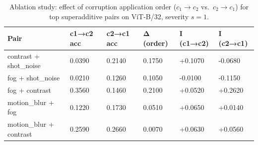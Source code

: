 \begin{table}
\caption{Ablation study: effect of corruption application order ($c_1 \to c_2$ vs.\ $c_2 \to c_1$) for top superadditive pairs on ViT-B/32, severity $s=1$.}
\label{tab:ablation}
\begin{tabular}{llllll}
\toprule
Pair & c1→c2 acc & c2→c1 acc & Δ (order) & I (c1→c2) & I (c2→c1) \\
\midrule
contrast + shot_noise & 0.0390 & 0.2140 & 0.1750 & +0.1070 & -0.0680 \\
fog + shot_noise & 0.0210 & 0.1260 & 0.1050 & -0.0100 & -0.1150 \\
fog + contrast & 0.3560 & 0.1460 & 0.2100 & +0.0520 & +0.2620 \\
motion_blur + fog & 0.1220 & 0.1730 & 0.0510 & +0.0650 & +0.0140 \\
motion_blur + contrast & 0.2590 & 0.2660 & 0.0070 & +0.0630 & +0.0560 \\
\bottomrule
\end{tabular}
\end{table}
